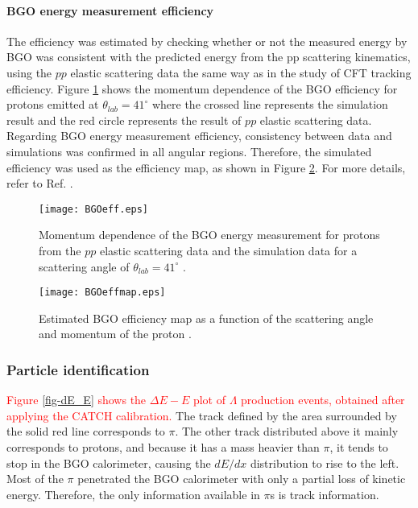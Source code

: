 \vspace{10pt}
\paragraph{BGO energy measurement efficiency }
The efficiency was estimated by checking whether or not the measured energy by BGO was consistent with the predicted energy from the pp scattering kinematics, using the $pp$ elastic scattering data the same way as in the study of CFT tracking efficiency. Figure \ref{fig-BGOeff}  shows the momentum dependence of the
BGO efficiency for protons emitted at $\theta_{lab}=41^{\circ}$ where the crossed line represents the simulation result and the red circle represents the result of $pp$ elastic scattering data. Regarding BGO energy measurement efficiency, consistency between data and simulations was confirmed in all angular regions. Therefore, the simulated efficiency was used as the efficiency map, as shown in Figure \ref{fig-BGOeffmap}. For more details, refer to Ref. \cite{Miwa-SMp}.

\begin{figure}[!h]
  \begin{center}
    \texttt{[image: BGOeff.eps]}
    \caption{Momentum dependence of the BGO energy measurement for protons from the $pp$ elastic scattering data and the simulation data for a scattering angle of $\theta_{lab}=41^{\circ}$ \cite{Miwa-SMp}.}
    \label{fig-BGOeff}
  \end{center}
\end{figure}

\begin{figure}[!h]
  \begin{center}
    \texttt{[image: BGOeffmap.eps]}
    \caption{Estimated BGO efficiency map as a function of the scattering angle and momentum of the proton \cite{Miwa-SMp}.}
    \label{fig-BGOeffmap}
  \end{center}
\end{figure}


\subsubsection{Particle identification}
\textcolor{red}{ Figure \ref{fig-dE_E} shows the $\Delta E-E$ plot of $\Lambda$ production events, obtained after applying the CATCH calibration. } The track defined by the area surrounded by the solid red line corresponds to $\pi$. The other track distributed above it mainly corresponds to protons, and because it has a mass heavier than $\pi$, it tends to stop in the BGO calorimeter, causing the $dE/dx$ distribution to rise to the left. Most of the $\pi$ penetrated the BGO calorimeter with only a partial loss of kinetic energy. Therefore, the only information available in $\pi$s is track information.

